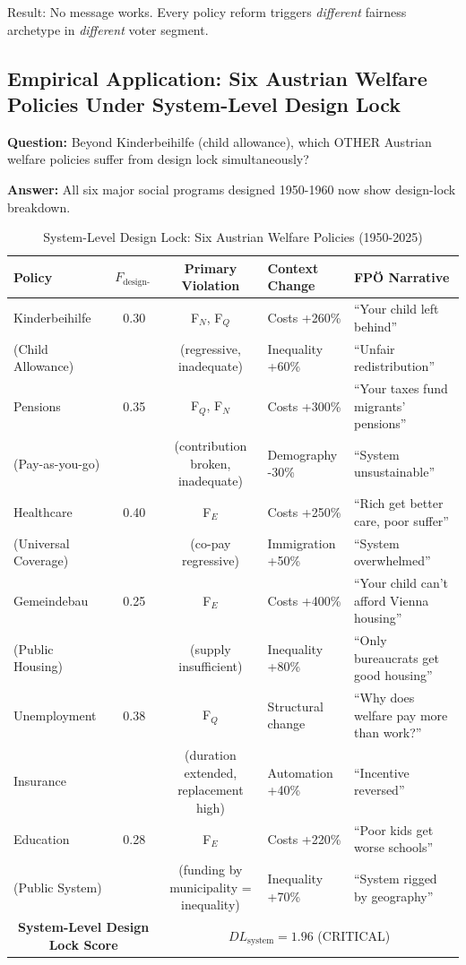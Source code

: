 Result: No message works. Every policy reform triggers \textit{different} fairness archetype in
\textit{different} voter segment.

\subsection{Empirical Application: Six Austrian Welfare Policies Under System-Level Design Lock}

\textbf{Question:} Beyond Kinderbeihilfe (child allowance), which OTHER Austrian welfare policies
suffer from design lock simultaneously?

\textbf{Answer:} All six major social programs designed 1950-1960 now show design-lock breakdown.

\begin{table}[htbp]
\centering
\caption{System-Level Design Lock: Six Austrian Welfare Policies (1950-2025)}
\label{tab:cm-systemlock-6policies}
\renewcommand{\arraystretch}{1.4}
\begin{tabular}{@{}lccll@{}}
\toprule
\textbf{Policy} & $F_{\text{design-lock}}$ & \textbf{Primary Violation} & \textbf{Context Change} & \textbf{FPÖ Narrative} \\
\midrule
Kinderbeihilfe & 0.30 & F$_N$, F$_Q$ & Costs +260\% & ``Your child left behind'' \\
(Child Allowance) & & (regressive, inadequate) & Inequality +60\% & ``Unfair redistribution'' \\
\midrule
Pensions & 0.35 & F$_Q$, F$_N$ & Costs +300\% & ``Your taxes fund migrants' pensions'' \\
(Pay-as-you-go) & & (contribution broken, inadequate) & Demography -30\% & ``System unsustainable'' \\
\midrule
Healthcare & 0.40 & F$_E$ & Costs +250\% & ``Rich get better care, poor suffer'' \\
(Universal Coverage) & & (co-pay regressive) & Immigration +50\% & ``System overwhelmed'' \\
\midrule
Gemeindebau & 0.25 & F$_E$ & Costs +400\% & ``Your child can't afford Vienna housing'' \\
(Public Housing) & & (supply insufficient) & Inequality +80\% & ``Only bureaucrats get good housing'' \\
\midrule
Unemployment & 0.38 & F$_Q$ & Structural change & ``Why does welfare pay more than work?'' \\
Insurance & & (duration extended, replacement high) & Automation +40\% & ``Incentive reversed'' \\
\midrule
Education & 0.28 & F$_E$ & Costs +220\% & ``Poor kids get worse schools'' \\
(Public System) & & (funding by municipality = inequality) & Inequality +70\% & ``System rigged by geography'' \\
\midrule
\multicolumn{2}{c}{\textbf{System-Level Design Lock Score}} & \multicolumn{3}{c}{$DL_{\text{system}} = 1.96$ (CRITICAL)} \\
\bottomrule
\end{tabular}
\end{table}

